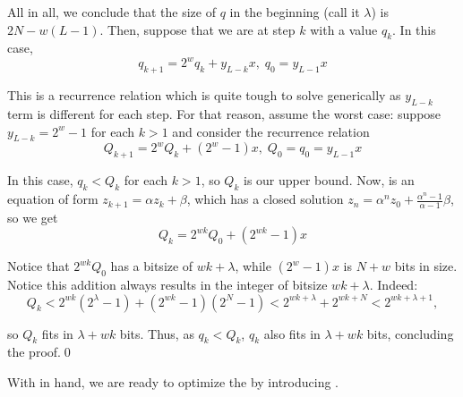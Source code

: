 \documentclass{iacrtrans}
\begin{document}
All in all, we conclude that the size of $q$ in the beginning (call it $\lambda$) is $2N - w(L-1)$. Then, suppose that we are at step $k$ with a value $q_k$. In this case,
\begin{equation}
    q_{k+1} = 2^wq_k + y_{L-k}x, \; q_0 = y_{L-1}x
\end{equation}

This is a recurrence relation which is quite tough to solve generically as $y_{L-k}$ term is different for each step. For that reason, assume the worst case: suppose $y_{L-k} = 2^w-1$ for each $k > 1$ and consider the recurrence relation
\begin{equation}\label{eq:recurrence_Q}
    Q_{k+1} = 2^wQ_k + (2^w-1)x, \; Q_0 = q_0 = y_{L-1}x
\end{equation}

In this case, $q_k < Q_k$ for each $k > 1$, so $Q_k$ is our upper bound. Now,  is an equation of form $z_{k+1}=\alpha z_k+\beta$, which has a closed solution $z_n = \alpha^n z_0 + \frac{\alpha^n-1}{\alpha-1}\beta$, so we get
\begin{equation}
    Q_k = 2^{wk}Q_0 + (2^{wk}-1)x
\end{equation}

Notice that $2^{wk}Q_0$ has a bitsize of $wk+\lambda$, while $(2^{w}-1)x$ is $N+w$ bits in size. Notice this addition always results in the integer of bitsize $wk+\lambda$. Indeed:
\begin{equation}
    Q_k < 2^{wk}(2^{\lambda}-1) + (2^{wk}-1)(2^{N}-1) < 2^{wk+\lambda} + 2^{wk+N} < 2^{wk+\lambda+1},
\end{equation}

so $Q_k$ fits in $\lambda+wk$ bits. Thus, as $q_k<Q_k$, $q_k$ also fits in $\lambda+wk$ bits, concluding the proof.\qed

With  in hand, we are ready to optimize the  by introducing . 
\end{document}

